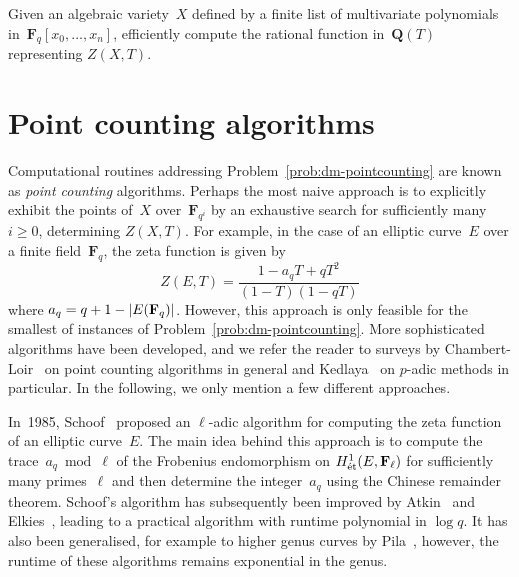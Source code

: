 \begin{prob} \label{prob:dm-pointcounting}
Given an algebraic variety~$X$ defined by a finite list of 
multivariate polynomials in~$\mathbf{F}_{q}[x_0, \dotsc, x_n]$, 
efficiently compute the rational function in~$\mathbf{Q}(T)$ 
representing $Z(X, T)$.
\end{prob}


\section{Point counting algorithms}

Computational routines addressing Problem~\ref{prob:dm-pointcounting} are 
known as \emph{point counting} algorithms.  Perhaps the most naive approach 
is to explicitly exhibit the points of~$X$ over~$\mathbf{F}_{q^i}$ by an 
exhaustive search for sufficiently many $i \geq 0$, determining $Z(X, T)$.  
For example, in the case of an elliptic curve~$E$ over a finite 
field~$\mathbf{F}_{q}$, the zeta function is given by 
\begin{equation*}
Z(E, T) = \frac{1 - a_q T + q T^2}{(1 - T)(1 - q T)}
\end{equation*}
where $a_q = q + 1 - \lvert E(\mathbf{F}_{q})\rvert$.  However, this 
approach is only feasible for the smallest of instances of 
Problem~\ref{prob:dm-pointcounting}.  More sophisticated algorithms 
have been developed, and we refer the reader to surveys by 
Chambert-Loir~\citep{ChambertLoir2008} on point counting algorithms 
in general and Kedlaya~\citep{Kedlaya2004} on $p$-adic methods in 
particular.  In the following, we only mention a few different approaches.

In~1985, Schoof~\citep{Schoof1985} proposed an $\ell$-adic algorithm for 
computing the zeta function of an elliptic curve~$E$.  The main idea behind 
this approach is to compute the trace~$a_q \bmod{\ell}$ of the Frobenius 
endomorphism on $H_{\text{\'et}}^{1}(E, \mathbf{F}_{\ell})$ for sufficiently 
many primes~$\ell$ and then determine the integer~$a_q$ using the Chinese 
remainder theorem.  Schoof's algorithm has subsequently been improved by 
Atkin~\citep{Atkin1988,Atkin1992} and Elkies~\citep{Elkies1998}, 
leading to a practical algorithm with runtime polynomial in $\log q$.  
It has also been generalised, for example to higher genus curves by 
Pila~\citep{Pila1990}, however, the runtime of these algorithms remains 
exponential in the genus.

